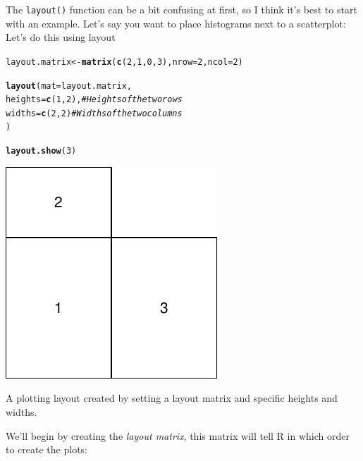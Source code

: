 \documentclass{tufte-book}\usepackage[]{graphicx}\usepackage[]{color}
\makeatletter
\def\maxwidth{ %
  \ifdim\Gin@nat@width>\linewidth
    \linewidth
  \else
    \Gin@nat@width
  \fi
}
\newcommand{\hlnum}[1]{\textcolor[rgb]{0.686,0.059,0.569}{#1}}%
\newcommand{\hlcom}[1]{\textcolor[rgb]{0.678,0.584,0.686}{\textit{#1}}}%
\newcommand{\hlstd}[1]{\textcolor[rgb]{0.345,0.345,0.345}{#1}}%
\newcommand{\hlkwb}[1]{\textcolor[rgb]{0.69,0.353,0.396}{#1}}%
\newcommand{\hlkwc}[1]{\textcolor[rgb]{0.333,0.667,0.333}{#1}}%
\newcommand{\hlkwd}[1]{\textcolor[rgb]{0.737,0.353,0.396}{\textbf{#1}}}%
\newenvironment{kframe}{%
 \def\at@end@of@kframe{}%
 \ifinner\ifhmode%
  \def\at@end@of@kframe{\end{minipage}}%
  \begin{minipage}{\columnwidth}%
 \fi\fi%
 \def\FrameCommand##1{\hskip\@totalleftmargin \hskip-\fboxsep
 \colorbox{shadecolor}{##1}\hskip-\fboxsep
     \hskip-\linewidth \hskip-\@totalleftmargin \hskip\columnwidth}%
 \MakeFramed {\advance\hsize-\width
   \@totalleftmargin\z@ \linewidth\hsize
   \@setminipage}}%
 {\par\unskip\endMakeFramed%
 \at@end@of@kframe}
\newenvironment{knitrout}{}{} %
\makeatother
\begin{document}
The \texttt{layout()} function can be a bit confusing at first, so I think it's best to start with an example. Let's say you want to place histograms next to a scatterplot: Let's do this using layout

\begin{marginfigure}
\begin{tiny}
\begin{knitrout}
\color{fgcolor}\begin{kframe}
\begin{alltt}
\hlstd{layout.matrix} \hlkwb{<-} \hlkwd{matrix}\hlstd{(}\hlkwd{c}\hlstd{(}\hlnum{2}\hlstd{,} \hlnum{1}\hlstd{,} \hlnum{0}\hlstd{,} \hlnum{3}\hlstd{),} \hlkwc{nrow} \hlstd{=} \hlnum{2}\hlstd{,} \hlkwc{ncol} \hlstd{=} \hlnum{2}\hlstd{)}

\hlkwd{layout}\hlstd{(}\hlkwc{mat} \hlstd{= layout.matrix,}
       \hlkwc{heights} \hlstd{=} \hlkwd{c}\hlstd{(}\hlnum{1}\hlstd{,} \hlnum{2}\hlstd{),} \hlcom{# Heights of the two rows}
       \hlkwc{widths} \hlstd{=} \hlkwd{c}\hlstd{(}\hlnum{2}\hlstd{,} \hlnum{2}\hlstd{)} \hlcom{# Widths of the two columns}
       \hlstd{)}

\hlkwd{layout.show}\hlstd{(}\hlnum{3}\hlstd{)}
\end{alltt}
\end{kframe}
\includegraphics[width=\maxwidth]{figure/unnamed-chunk-238-1} 

\end{knitrout}
\end{tiny}
\caption{A plotting layout created by setting a layout matrix and specific heights and widths.}
\label{fig:layout}
\end{marginfigure}

We'll begin by creating the \textit{layout matrix}, this matrix will tell R in which order to create the plots:
\end{document}
